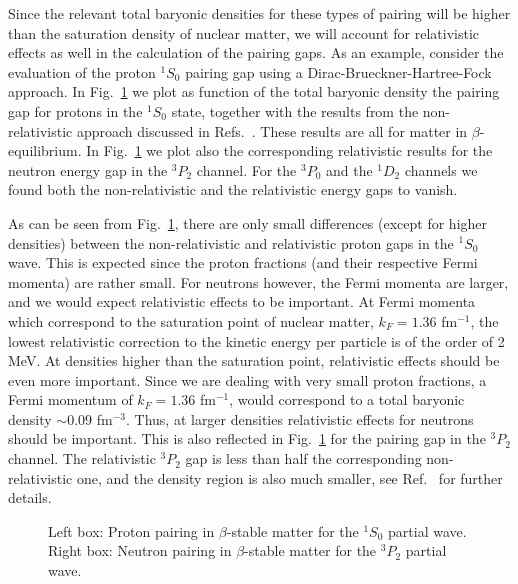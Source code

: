 \documentclass{ws-p9-75x6-50}
\begin{document}
Since the relevant total baryonic densities for these types of
pairing will be higher than the saturation
density of nuclear matter, we will account for relativistic
effects as well in the calculation of the pairing gaps.
As an example, consider the evaluation of the proton
$^1S_0$ pairing gap using a Dirac-Brueckner-Hartree-Fock  approach.
In Fig.\ \ref{fig:figgap} we plot as function of the total baryonic 
density the pairing gap for protons in the $^1S_0$
state, together with the results from the non-relativistic 
approach discussed in  Refs.\
\cite{elga96,eeho96}. 
These results are all 
for matter in $\beta$-equilibrium. In Fig.\ \ref{fig:figgap} 
we plot also the 
corresponding relativistic 
results for the neutron energy gap in the $^3P_2$ channel. 
For the 
$^3P_0$ and the $^1D_2$ channels we found both 
the non-relativistic and the relativistic
energy gaps to vanish. 

As can be seen from Fig.\ \ref{fig:figgap}, there are only small
differences (except for higher densities) between the non-relativistic
and relativistic proton gaps in the $^1S_0$ wave.
This is expected since the proton fractions (and their respective Fermi
momenta) are rather small.
For neutrons however, 
the Fermi momenta are larger, and we would 
expect relativistic effects to be important. At Fermi momenta
which correspond to the
saturation point of nuclear matter, $k_F=1.36$ fm$^{-1}$,
the lowest relativistic correction to the kinetic energy per 
particle is of the order of 2 MeV. 
At densities higher than the saturation
point, relativistic effects should be even 
more important.
Since we are dealing with
very small proton fractions, a Fermi momentum
of $k_F=1.36$ fm$^{-1}$, would correspond to a total baryonic 
density $\sim 0.09$  fm$^{-3}$. Thus, at larger densities 
relativistic effects for neutrons should
be important.
This is also reflected in Fig.\ \ref{fig:figgap} for the pairing
gap in the $^3P_2$ channel.
The relativistic $^3P_2$ gap is less  than half
the corresponding non-relativistic one, and the 
density region is also much smaller, see Ref.\ \cite{eeho96} for further details.
\begin{figure}\begin{center}
      {\epsfxsize=10pc }
      \caption{Left box: Proton pairing in $\beta$-stable matter for 
          the $^1S_0$ partial wave. Right box: Neutron pairing in 
          $\beta$-stable matter for the $^3P_2$
          partial wave.}
     \label{fig:figgap}
\end{center}\end{figure}
\end{document}
